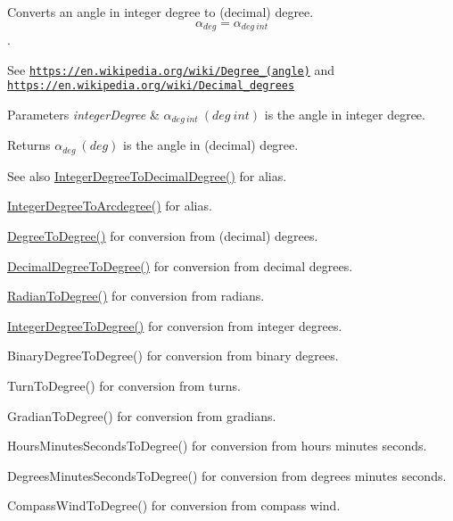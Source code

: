 Converts an angle in integer degree to (decimal) degree. \[\alpha_{deg}=\alpha_{deg\ int}\]. 

See \href{https://en.wikipedia.org/wiki/Degree_(angle)}{\tt https\+://en.\+wikipedia.\+org/wiki/\+Degree\+\_\+(angle)} and \href{https://en.wikipedia.org/wiki/Decimal_degrees}{\tt https\+://en.\+wikipedia.\+org/wiki/\+Decimal\+\_\+degrees} 
\begin{DoxyParams}{Parameters}
{\em integer\+Degree} & $\alpha_{deg\ int}\ (deg\ int)$ is the angle in integer degree. \\
\hline
\end{DoxyParams}
\begin{DoxyReturn}{Returns}
$\alpha_{deg}\ (deg)$ is the angle in (decimal) degree. 
\end{DoxyReturn}
\begin{DoxySeeAlso}{See also}
\mbox{\hyperlink{group___e_g_x_math-_angle_conversions-_integer_degree_gac219c3198508ba984d8d81d22831b27d}{Integer\+Degree\+To\+Decimal\+Degree()}} for alias. 

\mbox{\hyperlink{group___e_g_x_math-_angle_conversions-_integer_degree_gaf633d0b82bfb7586ce86ffbcf78d8f7a}{Integer\+Degree\+To\+Arcdegree()}} for alias. 

\mbox{\hyperlink{group___e_g_x_math-_angle_conversions-_degree_gaca157e7d3e99a46a11a04b92680d2574}{Degree\+To\+Degree()}} for conversion from (decimal) degrees. 

\mbox{\hyperlink{group___e_g_x_math-_angle_conversions-_decimal_degree_ga0aa7f2f5dbb00cf4ab303421c6e33ccf}{Decimal\+Degree\+To\+Degree()}} for conversion from decimal degrees. 

\mbox{\hyperlink{group___e_g_x_math-_angle_conversions-_radian_ga25bbce6cdc1c3621f2a158d320e3bc45}{Radian\+To\+Degree()}} for conversion from radians. 

\mbox{\hyperlink{group___e_g_x_math-_angle_conversions-_integer_degree_gaa9b63c6095fd7f8809fcfa2ba1e62235}{Integer\+Degree\+To\+Degree()}} for conversion from integer degrees. 

Binary\+Degree\+To\+Degree() for conversion from binary degrees. 

Turn\+To\+Degree() for conversion from turns. 

Gradian\+To\+Degree() for conversion from gradians. 

Hours\+Minutes\+Seconds\+To\+Degree() for conversion from hours minutes seconds. 

Degrees\+Minutes\+Seconds\+To\+Degree() for conversion from degrees minutes seconds. 

Compass\+Wind\+To\+Degree() for conversion from compass wind. 
\end{DoxySeeAlso}
\mbox{\label{group___e_g_x_math-_angle_conversions-_integer_degree_ga204317877546ea6bbafe5ff558f55a16}} 
